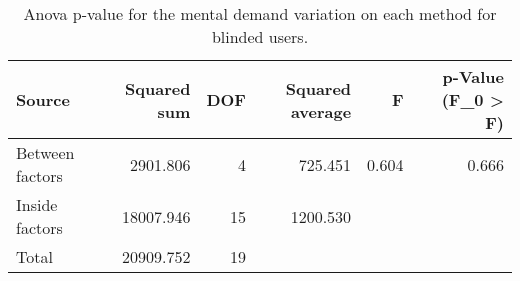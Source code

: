 
\begin{table}[!htb]
\centering
\caption{Anova p-value for the mental demand variation on each method for blinded users.}
\label{tab:anova_mental_demand_var}
\begin{tabular}{lrrrrr}
\toprule
         Source &  Squared sum &  DOF & Squared average &     F & p-Value (F\_0 > F) \\
\midrule
Between factors &     2901.806 &    4 &         725.451 & 0.604 &             0.666 \\
 Inside factors &    18007.946 &   15 &        1200.530 &       &                   \\
          Total &    20909.752 &   19 &                 &       &                   \\
\bottomrule
\end{tabular}
\end{table}


